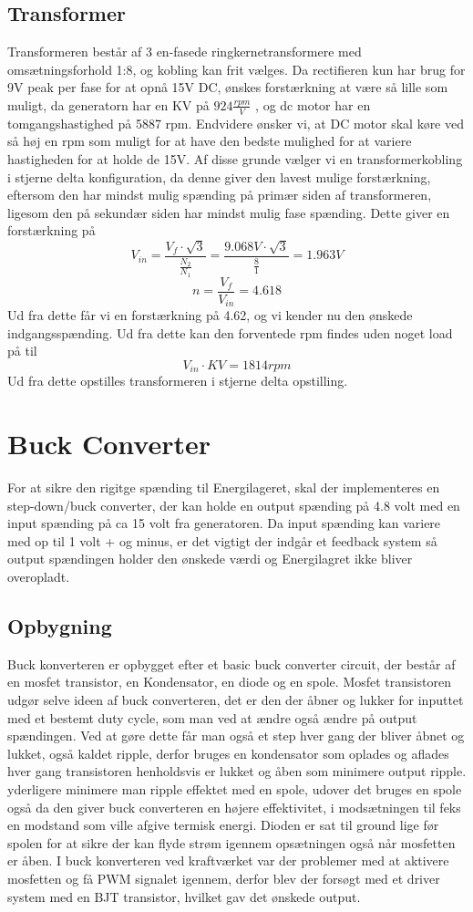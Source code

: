 \documentclass[../main.tex]{subfiles}
\begin{document}
\subsection{Transformer}
Transformeren består af 3 en-fasede ringkernetransformere med omsætningsforhold 1:8, og kobling kan frit vælges. Da rectifieren kun har brug for 9V peak per fase for at opnå 15V DC, ønskes forstærkning at være så lille som muligt, da generatorn har en KV på $ 924 \frac{rpm}{V}$  , og dc motor har en tomgangshastighed på 5887 rpm. Endvidere ønsker vi, at DC motor skal køre ved så høj en rpm som muligt for at have den bedste mulighed for at variere hastigheden for at holde de 15V. Af disse grunde vælger vi en transformerkobling i stjerne delta konfiguration, da denne giver den lavest mulige forstærkning, eftersom den har mindst mulig spænding på primær siden af transformeren, ligesom den på sekundær siden har mindst mulig fase spænding. Dette giver en forstærkning på
$$ V_{in} =\frac{ V_f \cdot \sqrt{3}}{\frac{N_2}{N_1}} = \frac{9.068V \cdot \sqrt{3}}{\frac{8}{1}} = 1.963V$$
$$n = \frac{V_f}{V_{in}}=4.618$$
Ud fra dette får vi en forstærkning på 4.62, og vi kender nu den ønskede indgangsspænding. Ud fra dette kan den forventede rpm findes uden noget load på til
$$V_{in} \cdot KV = 1814rpm$$
Ud fra dette opstilles transformeren i stjerne delta opstilling.

\section{Buck Converter}
For at sikre den rigitge spænding til Energilageret, skal der implementeres en step-down/buck converter, der kan holde en output spænding på 4.8 volt med en input spænding på ca 15 volt fra generatoren. Da input spænding kan variere med op til 1 volt + og minus, er det vigtigt der indgår et feedback system så output spændingen holder den ønskede værdi og Energilagret ikke bliver overopladt.

\subsection{Opbygning}
Buck konverteren er opbygget efter et basic buck converter circuit, der består af en mosfet transistor, en Kondensator, en diode og en spole. Mosfet transistoren udgør selve ideen af buck converteren, det er den der åbner og lukker for inputtet med et bestemt duty cycle, som man ved at ændre også ændre på output spændingen. Ved at gøre dette får man også et step hver gang der bliver åbnet og lukket, også kaldet ripple, derfor bruges en kondensator som oplades og aflades hver gang transistoren henholdsvis er lukket og åben som minimere output ripple. yderligere minimere man ripple effektet med en spole, udover det bruges en spole også da den giver buck converteren en højere effektivitet, i modsætningen til feks en modstand som ville afgive termisk energi. Dioden er sat til ground lige før spolen for at sikre der kan flyde strøm igennem opsætningen også når mosfetten er åben. 
I buck konverteren ved kraftværket var der problemer med at aktivere mosfetten og få PWM signalet igennem, derfor blev der forsøgt med et driver system med en BJT transistor, hvilket gav det ønskede output. 
\end{document}

